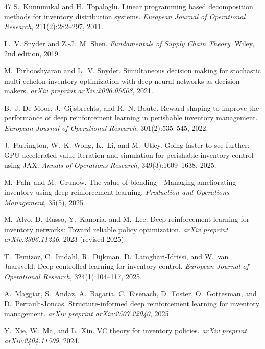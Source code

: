 \documentclass[11pt]{article}
\begin{document}
\begin{thebibliography}{47}
S.~Kunnumkal and H.~Topaloglu.
Linear programming based decomposition methods for inventory distribution systems.
\emph{European Journal of Operational Research}, 211(2):282--297, 2011.

L.~V. Snyder and Z.-J.~M. Shen.
\emph{Fundamentals of Supply Chain Theory}.
Wiley, 2nd edition, 2019.

M.~Pirhooshyaran and L.~V. Snyder.
Simultaneous decision making for stochastic multi-echelon inventory optimization with deep neural networks as decision makers.
\emph{arXiv preprint arXiv:2006.05608}, 2021.

B.~J. De Moor, J.~Gijsbrechts, and R.~N. Boute.
Reward shaping to improve the performance of deep reinforcement learning in perishable inventory management.
\emph{European Journal of Operational Research}, 301(2):535--545, 2022.

J.~Farrington, W.~K. Wong, K.~Li, and M.~Utley.
Going faster to see further: GPU-accelerated value iteration and simulation for perishable inventory control using JAX.
\emph{Annals of Operations Research}, 349(3):1609--1638, 2025.

M.~Pahr and M.~Grunow.
The value of blending---Managing ameliorating inventory using deep reinforcement learning.
\emph{Production and Operations Management}, 35(5), 2025.

M.~Alvo, D.~Russo, Y.~Kanoria, and M.~Lee.
Deep reinforcement learning for inventory networks: Toward reliable policy optimization.
\emph{arXiv preprint arXiv:2306.11246}, 2023 (revised 2025).

T.~Temiz\"oz, C.~Imdahl, R.~Dijkman, D.~Lamghari-Idrissi, and W.~van Jaarsveld.
Deep controlled learning for inventory control.
\emph{European Journal of Operational Research}, 324(1):104--117, 2025.

A.~Maggiar, S.~Andaz, A.~Bagaria, C.~Eisenach, D.~Foster, O.~Gottesman, and D.~Perrault-Joncas.
Structure-informed deep reinforcement learning for inventory management.
\emph{arXiv preprint arXiv:2507.22040}, 2025.

Y.~Xie, W.~Ma, and L.~Xin.
VC theory for inventory policies.
\emph{arXiv preprint arXiv:2404.11509}, 2024.


\end{thebibliography}
\end{document}

